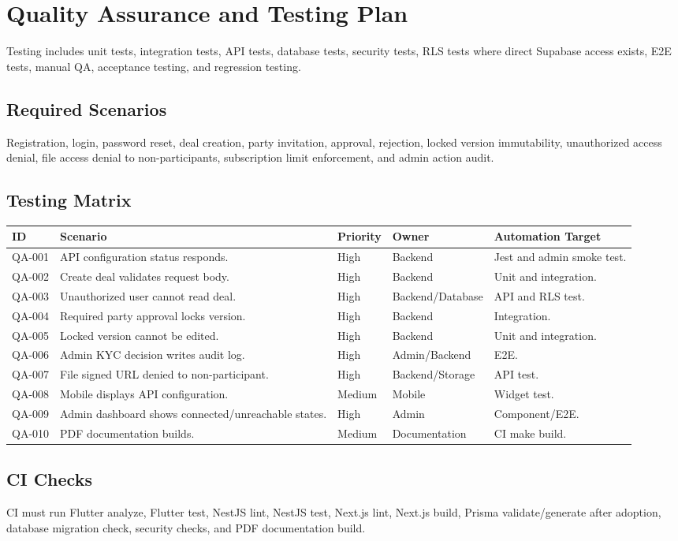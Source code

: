 \chapter{Quality Assurance and Testing Plan}
Testing includes unit tests, integration tests, API tests, database tests, security tests, RLS tests where direct Supabase access exists, E2E tests, manual QA, acceptance testing, and regression testing.
\section{Required Scenarios}
Registration, login, password reset, deal creation, party invitation, approval, rejection, locked version immutability, unauthorized access denial, file access denial to non-participants, subscription limit enforcement, and admin action audit.

\section{Testing Matrix}
\begin{longtable}{p{}p{}p{}p{}p{}}
\toprule
ID & Scenario & Priority & Owner & Automation Target \\
\midrule
QA-001 & API configuration status responds. & High & Backend & Jest and admin smoke test. \\
QA-002 & Create deal validates request body. & High & Backend & Unit and integration. \\
QA-003 & Unauthorized user cannot read deal. & High & Backend/Database & API and RLS test. \\
QA-004 & Required party approval locks version. & High & Backend & Integration. \\
QA-005 & Locked version cannot be edited. & High & Backend & Unit and integration. \\
QA-006 & Admin KYC decision writes audit log. & High & Admin/Backend & E2E. \\
QA-007 & File signed URL denied to non-participant. & High & Backend/Storage & API test. \\
QA-008 & Mobile displays API configuration. & Medium & Mobile & Widget test. \\
QA-009 & Admin dashboard shows connected/unreachable states. & High & Admin & Component/E2E. \\
QA-010 & PDF documentation builds. & Medium & Documentation & CI make build. \\
\bottomrule
\end{longtable}

\section{CI Checks}
CI must run Flutter analyze, Flutter test, NestJS lint, NestJS test, Next.js lint, Next.js build, Prisma validate/generate after adoption, database migration check, security checks, and PDF documentation build.
